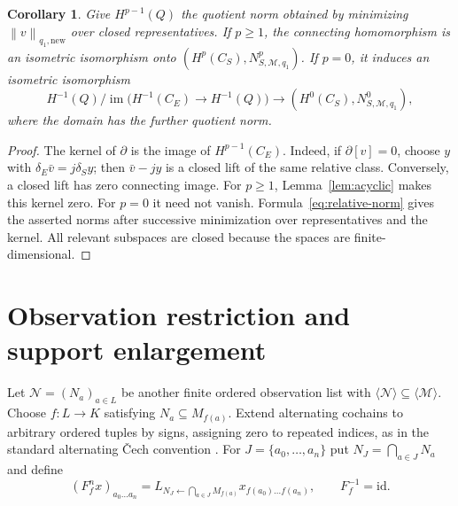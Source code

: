 \documentclass[11pt,a4paper]{article}
\numberwithin{equation}{section}
\newtheorem{corollary}[theorem]{Corollary}
\theoremstyle{remark}
\newcommand{\M}{\mathcal M}
\newcommand{\im}{\operatorname{im}}
\newcommand{\id}{\mathrm{id}}
\newcommand{\norm}[1]{\left\lVert #1\right\rVert}
\begin{document}
\begin{corollary}\label{cor:relative-isometry}
Give $H^{p-1}(Q)$ the quotient norm obtained by minimizing $\norm{v}_{q_1,\mathrm{new}}$ over closed representatives. If $p\ge1$, the connecting homomorphism is an isometric isomorphism onto $(H^p(C_S),N^p_{S,\M,q_1})$. If $p=0$, it induces an isometric isomorphism
\[
 H^{-1}(Q)/\im\bigl(H^{-1}(C_E)\to H^{-1}(Q)\bigr)
 \longrightarrow (H^0(C_S),N^0_{S,\M,q_1}),
\]
where the domain has the further quotient norm.
\end{corollary}
\begin{proof}
The kernel of $\partial$ is the image of $H^{p-1}(C_E)$. Indeed, if $\partial[v]=0$, choose $y$ with $\delta_E\bar v=j\delta_Sy$; then $\bar v-jy$ is a closed lift of the same relative class. Conversely, a closed lift has zero connecting image. For $p\ge1$, Lemma~\ref{lem:acyclic} makes this kernel zero. For $p=0$ it need not vanish. Formula~\eqref{eq:relative-norm} gives the asserted norms after successive minimization over representatives and the kernel. All relevant subspaces are closed because the spaces are finite-dimensional.
\end{proof}

\section{Observation restriction and support enlargement}\label{sec:comparison}
Let $\mathcal N=(N_a)_{a\in L}$ be another finite ordered observation list with $\langle\mathcal N\rangle\subseteq\langle\M\rangle$. Choose $f:L\to K$ satisfying $N_a\subseteq M_{f(a)}$. Extend alternating cochains to arbitrary ordered tuples by signs, assigning zero to repeated indices, as in the standard alternating \v{C}ech convention \cite[Tag~01FG]{Stacks}. For $J=\{a_0,\ldots,a_n\}$ put $N_J=\bigcap_{a\in J}N_a$ and define
\begin{equation}\label{eq:restriction}
 (F_f^nx)_{a_0\ldots a_n}
 =L_{N_J\leftarrow\bigcap_{a\in J}M_{f(a)}}x_{f(a_0)\ldots f(a_n)},
 \qquad F_f^{-1}=\id.
\end{equation}
\end{document}
